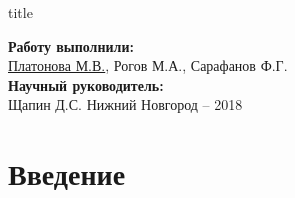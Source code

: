 
\newcommand{\sq}[1]{\tikz{\draw[draw=#1,fill=#1] (0,0) rectangle (0.7em,0.7em);}}
  

\begin{frame}[plain]
	\centering
	\vspace{2cm}
	\begin{beamercolorbox}[sep=8pt,center]{title}
		\bf{}\inserttitle
	\end{beamercolorbox}
	\vspace{0.5cm}
	\normalsize \textbf{Работу выполнили:}\\
	\large
	\underline{Платонова М.В.}, %
	{Рогов М.А.,}
	Сарафанов Ф.Г. %
	\\ 
	\vspace{0.5cm}
	\normalsize{\textbf{Научный руководитель:}\\}
	\large{Щапин Д.С.}
	\vfill
	\small{Нижний Новгород -- 2018}
\end{frame}

\section{Введение}
